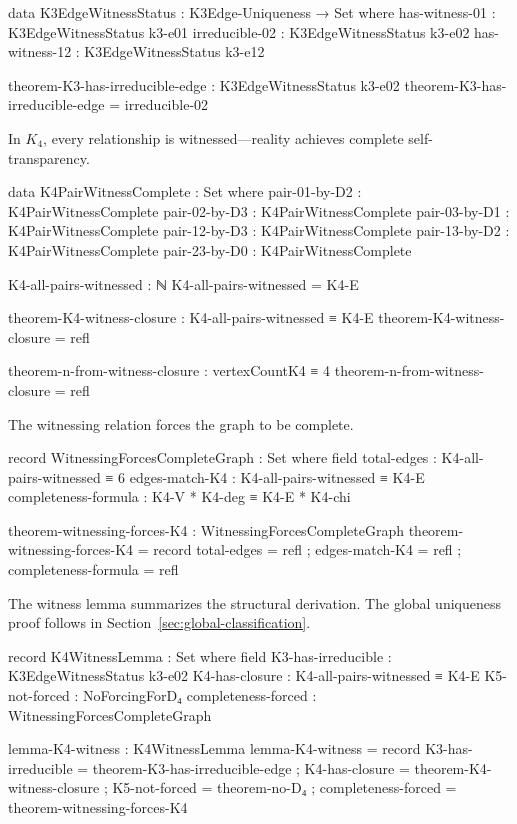 \documentclass[11pt,a4paper]{book}
\begin{document}
\begin{code}
data K3EdgeWitnessStatus : K3Edge-Uniqueness → Set where
  has-witness-01  : K3EdgeWitnessStatus k3-e01
  irreducible-02  : K3EdgeWitnessStatus k3-e02
  has-witness-12  : K3EdgeWitnessStatus k3-e12

theorem-K3-has-irreducible-edge : K3EdgeWitnessStatus k3-e02
theorem-K3-has-irreducible-edge = irreducible-02
\end{code}

In $K_4$, every relationship is witnessed—reality achieves complete self-transparency.

\begin{code}
data K4PairWitnessComplete : Set where
  pair-01-by-D2 : K4PairWitnessComplete
  pair-02-by-D3 : K4PairWitnessComplete
  pair-03-by-D1 : K4PairWitnessComplete
  pair-12-by-D3 : K4PairWitnessComplete
  pair-13-by-D2 : K4PairWitnessComplete
  pair-23-by-D0 : K4PairWitnessComplete

K4-all-pairs-witnessed : ℕ
K4-all-pairs-witnessed = K4-E

theorem-K4-witness-closure : K4-all-pairs-witnessed ≡ K4-E
theorem-K4-witness-closure = refl

theorem-n-from-witness-closure : vertexCountK4 ≡ 4
theorem-n-from-witness-closure = refl
\end{code}

The witnessing relation forces the graph to be complete.

\begin{code}
record WitnessingForcesCompleteGraph : Set where
  field
    total-edges : K4-all-pairs-witnessed ≡ 6
    edges-match-K4 : K4-all-pairs-witnessed ≡ K4-E
    completeness-formula : K4-V * K4-deg ≡ K4-E * K4-chi

theorem-witnessing-forces-K4 : WitnessingForcesCompleteGraph
theorem-witnessing-forces-K4 = record
  { total-edges = refl
  ; edges-match-K4 = refl
  ; completeness-formula = refl
  }
\end{code}

The witness lemma summarizes the structural derivation. The global uniqueness proof follows in Section~\ref{sec:global-classification}.

\begin{code}
record K4WitnessLemma : Set where
  field
    K3-has-irreducible   : K3EdgeWitnessStatus k3-e02
    K4-has-closure       : K4-all-pairs-witnessed ≡ K4-E
    K5-not-forced        : NoForcingForD₄
    completeness-forced  : WitnessingForcesCompleteGraph

lemma-K4-witness : K4WitnessLemma
lemma-K4-witness = record
  { K3-has-irreducible  = theorem-K3-has-irreducible-edge
  ; K4-has-closure      = theorem-K4-witness-closure
  ; K5-not-forced       = theorem-no-D₄
  ; completeness-forced = theorem-witnessing-forces-K4
  }
\end{code}
\end{document}
